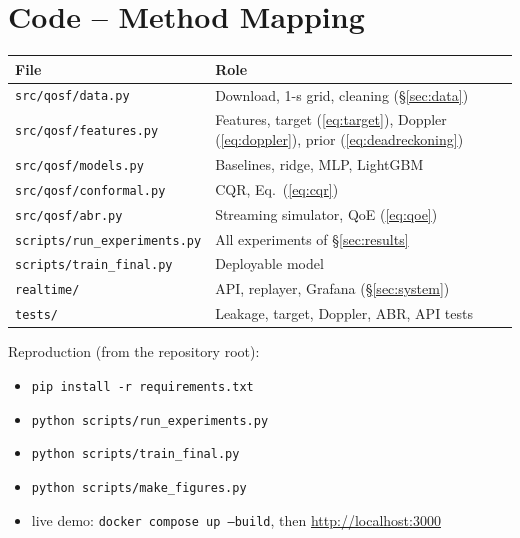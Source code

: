 \documentclass[10pt,a4paper,twocolumn]{article}
\renewcommand\thesection{\Roman{section}}
\begin{document}
\appendix
\renewcommand\thesection{\Alph{section}}
\section{Code -- Method Mapping}
\begin{center}\footnotesize
\setlength{\tabcolsep}{3pt}
\begin{tabular}{@{}p{40mm}p{44mm}@{}}
\toprule
File & Role \\
\midrule
\texttt{src/qosf/data.py} & Download, 1-s grid, cleaning (§\ref{sec:data}) \\
\texttt{src/qosf/features.py} & Features, target (\ref{eq:target}), Doppler (\ref{eq:doppler}), prior (\ref{eq:deadreckoning}) \\
\texttt{src/qosf/models.py} & Baselines, ridge, MLP, LightGBM \\
\texttt{src/qosf/conformal.py} & CQR, Eq.~(\ref{eq:cqr}) \\
\texttt{src/qosf/abr.py} & Streaming simulator, QoE (\ref{eq:qoe}) \\
\texttt{scripts/run\_experiments.py} & All experiments of §\ref{sec:results} \\
\texttt{scripts/train\_final.py} & Deployable model \\
\texttt{realtime/} & API, replayer, Grafana (§\ref{sec:system}) \\
\texttt{tests/} & Leakage, target, Doppler, ABR, API tests \\
\bottomrule
\end{tabular}
\end{center}
Reproduction (from the repository root):
\begin{itemize}
\item \texttt{pip install -r requirements.txt}
\item \texttt{python scripts/run\_experiments.py}
\item \texttt{python scripts/train\_final.py}
\item \texttt{python scripts/make\_figures.py}
\item live demo: \texttt{docker compose up --build}, then \url{http://localhost:3000}
\end{itemize}
\end{document}
